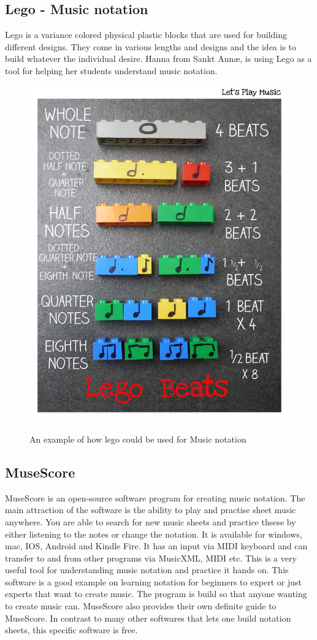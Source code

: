 \subsection{Lego - Music notation}
Lego is a variance colored physical plastic blocks that are used for building different designs. They come in various lengths and designs and the idea is to build whatever the individual desire. Hanna from Sankt Annæ, is using Lego as a tool for helping her students understand music notation.

\begin{figure}[H]
	\centering
	\includegraphics[width=0.7\linewidth]{figure/Analysis/lego}
	\label{fig:lego}
	\caption{An example of how lego could be used for Music notation}
\end{figure}

\subsection{MuseScore}
MuseScore is an open-source software program for creating music notation. The main attraction of the software is the ability to play and practise sheet music anywhere. You are able to search for new music sheets and practice thsese by either listening to the notes or change the notation. It is available for windows, mac, IOS, Android and Kindle Fire. It has an input via MIDI keyboard and can transfer to and from other programs via MusicXML, MIDI etc. This is a very useful tool for understanding music notation and practice it hands on. This software is a good example on learning notation for beginners to expert or just experts that want to create music. The program is build so that anyone wanting to create music can. MuseScore also provides their own definite guide to MuseScore. In contrast to many other softwares that lets one build notation sheets, this specific software is free. 

